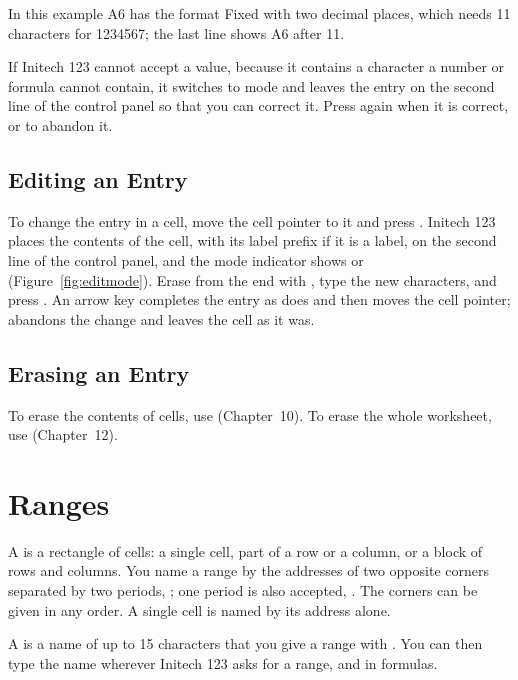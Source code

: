 In this example A6 has the format Fixed with two decimal places, which
needs 11 characters for 1234567; the last line shows A6 after
 11.


If Initech 123 cannot accept a value, because it contains a character a
number or formula cannot contain, it switches to  mode and leaves
the entry on the second line of the control panel so that you can correct
it.  Press  again when it is correct, or  to
abandon it.

\subsection{Editing an Entry}
To change the entry in a cell, move the cell pointer to it and press
.  Initech 123 places the contents of the cell, with its
label prefix if it is a label, on the second line of the control panel,
and the mode indicator shows  or 
(Figure~\ref{fig:editmode}).  Erase from the end with ,
type the new characters, and press .  An arrow key completes
the entry as  does and then moves the cell pointer;
 abandons the change and leaves the cell as it was.


\subsection{Erasing an Entry}
To erase the contents of cells, use 
(Chapter~10).  To erase the whole worksheet, use
 (Chapter~12).

\section{Ranges}
A  is a rectangle of cells: a single cell, part of a row or a
column, or a block of rows and columns.  You name a range by the addresses
of two opposite corners separated by two periods, ; one period
is also accepted, .  The corners can be given in any order.  A
single cell is named by its address alone.

A  is a name of up to 15 characters that you give a range
with .  You can then type the name wherever
Initech 123 asks for a range, and in formulas.

